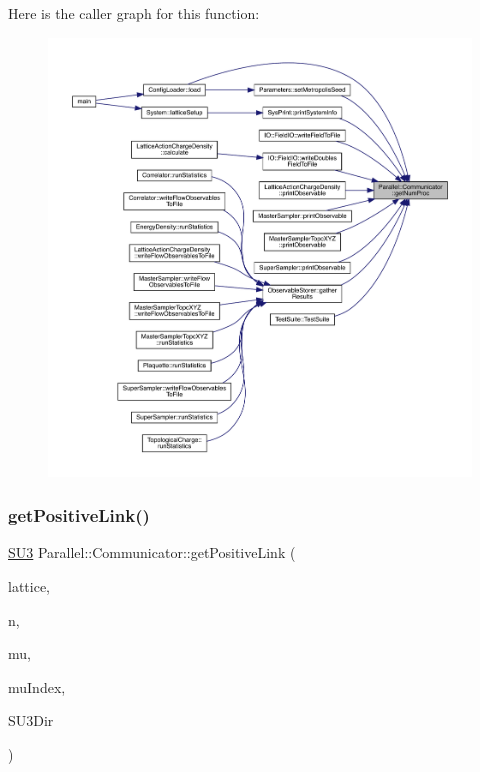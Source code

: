 Here is the caller graph for this function\+:
\nopagebreak
\begin{figure}[H]
\begin{center}
\leavevmode
\includegraphics[width=350pt]{class_parallel_1_1_communicator_a7b1f80fb49a0cc83f2031c3415174150_icgraph}
\end{center}
\end{figure}
\mbox{\label{class_parallel_1_1_communicator_ae715d67d2e60def9bf529702a64f4caa}} 
\subsubsection{\texorpdfstring{getPositiveLink()}{getPositiveLink()}}
{\footnotesize\ttfamily \mbox{\hyperlink{class_s_u3}{S\+U3}} Parallel\+::\+Communicator\+::get\+Positive\+Link (\begin{DoxyParamCaption}\item[{\mbox{\hyperlink{class_lattice}{Lattice}}$<$ \mbox{\hyperlink{class_s_u3}{S\+U3}} $>$ $\ast$}]{lattice,  }\item[{std\+::vector$<$ int $>$}]{n,  }\item[{int}]{mu,  }\item[{int $\ast$}]{mu\+Index,  }\item[{int}]{S\+U3\+Dir }\end{DoxyParamCaption})\hspace{0.3cm}{\ttfamily [static]}}

